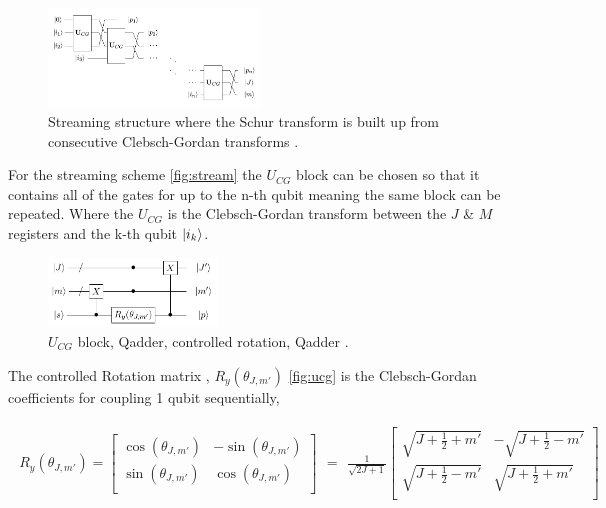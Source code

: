 \documentclass[12pt]{article}
\begin{document}
\begin{figure}[h!]
\centering
\includegraphics[width=0.5\textwidth]{schurcascade.png}
\caption{Streaming structure where the Schur transform is built up from consecutive Clebsch-Gordan transforms \cite{bacon2006efficient}.}
\label{fig:stream}
\end{figure}

For the streaming scheme \autoref{fig:stream} the $U_{CG}$ block can be chosen so that it contains all of the gates for up to the n-th qubit meaning the same block can be repeated. Where the $U_{CG}$ is the Clebsch-Gordan transform between the $J$ \& $M$ registers and the k-th qubit $\left\vert{i_k}\right\rangle$.

\begin{figure}[h!]
\centering
\includegraphics[width=0.4\textwidth]{genaddercirc.png}
\caption{$U_{CG}$ block, Qadder, controlled rotation, Qadder \cite{bacon2006efficient}.}
\label{fig:ucg}
\end{figure}

The controlled Rotation matrix \cite{bacon2006efficient}, $R_y(\theta_{J,m'})$ \autoref{fig:ucg} is the Clebsch-Gordan coefficients for coupling 1 qubit sequentially,

\begin{align}
\begin{split}
R_y(\theta_{J,m'})=
\begin{bmatrix}
\cos(\theta_{J,m'}) &-\sin(\theta_{J,m'}) \\
\sin(\theta_{J,m'}) & \cos(\theta_{J,m'}) \\
\end{bmatrix}
\end{split}
=
\begin{split}
\frac{1}{\sqrt{2J+1}}
\begin{bmatrix}
\sqrt{J+\frac{1}{2}+m'} &-\sqrt{J+\frac{1}{2}-m'} \\
\sqrt{J+\frac{1}{2}-m'} & \sqrt{J+\frac{1}{2}+m'} \\
\end{bmatrix}
\end{split}
\label{eq:rotmatrix}
\end{align}
\end{document}
